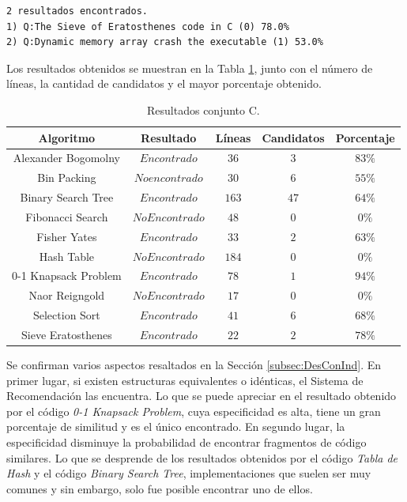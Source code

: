 \begin{lstlisting}[caption={The Sieve of Eratosthenes.},label={lst:sieve}]
2 resultados encontrados.
1) Q:The Sieve of Eratosthenes code in C (0) 78.0%
2) Q:Dynamic memory array crash the executable (1) 53.0%
\end{lstlisting}

Los resultados obtenidos se muestran en la Tabla \ref{tab:res3},
junto con el número de líneas,
la cantidad de candidatos y
el mayor porcentaje obtenido.

\begin{table}[h]
\caption{Resultados conjunto C.}
\label{tab:res3}
\centering
\begin{tabular}{ccccc}
\hline
{Algoritmo} & {Resultado} & {Líneas} & {Candidatos} & {Porcentaje} \\
\hline
Alexander Bogomolny & $Encontrado$ & $36$ & $3$ & $83\%$ \\
Bin Packing & $No encontrado$ & $30$ & $6$ & $55\%$ \\
Binary Search Tree & $Encontrado$ & $163$ & $47$ & $64\%$ \\
Fibonacci Search & $No Encontrado$ & $48$ & $0$ & $0\%$ \\
Fisher Yates & $Encontrado$ & $33$ & $2$ & $63\%$ \\
Hash Table & $No Encontrado$ & $184$ & $0$ & $0\%$ \\
0-1 Knapsack Problem & $Encontrado$ & $78$ & $1$ & $94\%$ \\
Naor Reigngold & $No Encontrado$ & $17$ & $0$ & $0\%$ \\
Selection Sort & $Encontrado$ & $41$ & $6$ & $68\%$ \\
Sieve Eratosthenes & $Encontrado$ & $22$ & $2$ & $78\%$ \\
\hline
\end{tabular}
\end{table}

Se confirman varios aspectos resaltados en la Sección \ref{subsec:DesConInd}.
En primer lugar, si existen estructuras equivalentes o idénticas, 
el Sistema de Recomendación las encuentra.
Lo que se puede apreciar en el resultado obtenido por el código \textit{0-1 Knapsack Problem},
cuya especificidad es alta, tiene un gran porcentaje de similitud y es el único encontrado.
En segundo lugar, la especificidad disminuye la probabilidad de encontrar fragmentos de código similares.
Lo que se desprende de los resultados obtenidos por el código \textit{Tabla de Hash} y el código \textit{Binary Search Tree},
implementaciones que suelen ser muy comunes y sin embargo, solo fue posible encontrar uno de ellos.

